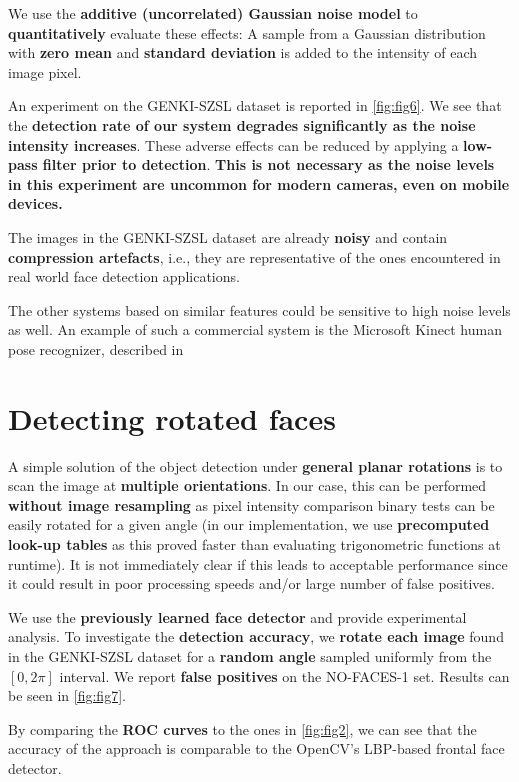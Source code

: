 \documentclass[a4paper,12pt]{article}
\begin{document}
We use the \textbf{additive (uncorrelated) Gaussian noise model} to \textbf{quantitatively} evaluate these effects:
A sample from a Gaussian distribution with \textbf{zero mean} and \textbf{standard deviation} is added to the intensity of each image pixel.

An experiment on the GENKI-SZSL dataset is reported in \autoref{fig:fig6}. We see that the \textbf{detection rate of our system degrades significantly as the noise intensity increases}. These adverse effects can be reduced by applying a \textbf{low-pass filter prior to detection}. 
\textbf{This is not necessary as the noise levels in this experiment are uncommon for modern cameras,
even on mobile devices.}

The images in the GENKI-SZSL dataset are already \textbf{noisy} and contain 
\textbf{compression artefacts}, i.e., they are representative of the ones encountered in real world
face detection applications.

The other systems based on similar features could be sensitive to high noise levels as well. An example of such a commercial system is the Microsoft Kinect human pose recognizer, described in

\section{Detecting rotated faces}
A simple solution of the object detection under \textbf{general planar rotations} is to scan the
image at \textbf{multiple orientations}. In our case, this can be performed
\textbf{without image resampling} as pixel intensity comparison binary tests can be easily rotated for a given angle (in our implementation, we use \textbf{precomputed look-up tables} as this
proved faster than evaluating trigonometric functions at runtime).
It is not immediately clear if this leads to acceptable
performance since it could result in poor processing speeds and/or large number of false positives.

We use the \textbf{previously learned face detector} and provide experimental analysis. 
To investigate the \textbf{detection accuracy}, we \textbf{rotate each image} found in the GENKI-SZSL dataset
for a \textbf{random angle} sampled uniformly from the $[0, 2\pi]$ interval.
We report \textbf{false positives} on the NO-FACES-1 set. Results can be seen in \autoref{fig:fig7}. 

By comparing the \textbf{ROC curves} to the ones in \autoref{fig:fig2},
we can see that the accuracy of the approach is comparable to the OpenCV's LBP-based frontal face detector. 
\end{document}
